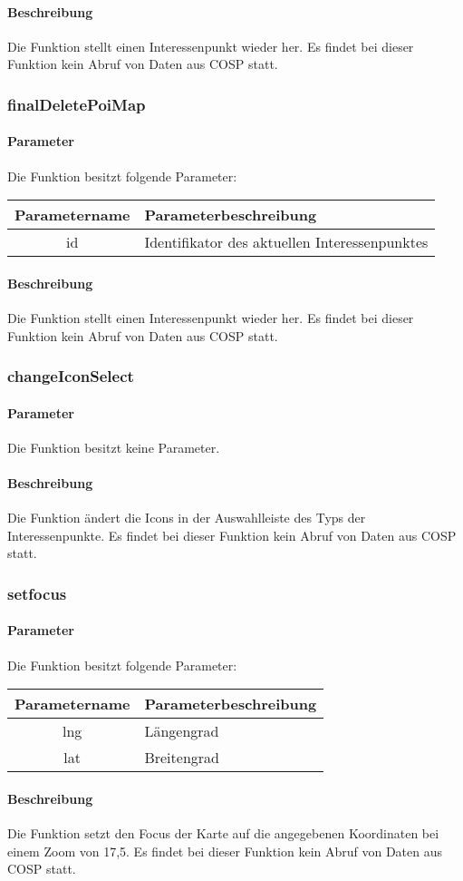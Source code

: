 \paragraph{Beschreibung} Die Funktion stellt einen Interessenpunkt wieder her. Es findet bei dieser Funktion kein Abruf von Daten aus {\glqq COSP\grqq} statt.
\subsubsection{finalDeletePoiMap}
\paragraph{Parameter} Die Funktion besitzt folgende Parameter:
\begin{table}[H]
	\begin{tabular}{|c|p{11cm}|}
		\hline
		\textbf{Parametername} & \textbf{Parameterbeschreibung} \\ \hline
		id    & Identifikator des aktuellen Interessenpunktes \\ \hline
	\end{tabular}
\end{table}
\paragraph{Beschreibung} Die Funktion stellt einen Interessenpunkt wieder her. Es findet bei dieser Funktion kein Abruf von Daten aus {\glqq COSP\grqq} statt.
\subsubsection{changeIconSelect}
\paragraph{Parameter} Die Funktion besitzt keine Parameter.
\paragraph{Beschreibung} Die Funktion ändert die Icons in der Auswahlleiste des Typs der Interessenpunkte. Es findet bei dieser Funktion kein Abruf von Daten aus {\glqq COSP\grqq} statt.
\subsubsection{setfocus}
\paragraph{Parameter} Die Funktion besitzt folgende Parameter:
\begin{table}[H]
	\begin{tabular}{|c|p{11cm}|}
		\hline
		\textbf{Parametername} & \textbf{Parameterbeschreibung} \\ \hline
		lng & Längengrad \\ \hline
		lat & Breitengrad \\ \hline
	\end{tabular}
\end{table}
\paragraph{Beschreibung} Die Funktion setzt den Focus der Karte auf die angegebenen Koordinaten bei einem Zoom von 17,5. Es findet bei dieser Funktion kein Abruf von Daten aus {\glqq COSP\grqq} statt.